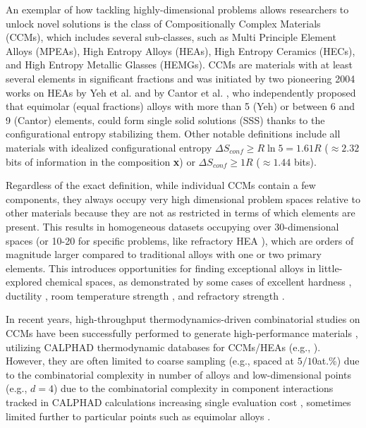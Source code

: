 An exemplar of how tackling highly-dimensional problems allows researchers to unlock novel solutions is the class of Compositionally Complex Materials (CCMs), which includes several sub-classes, such as Multi Principle Element Alloys (MPEAs), High Entropy Alloys (HEAs), High Entropy Ceramics (HECs), and High Entropy Metallic Glasses (HEMGs). CCMs are materials with at least several elements in significant fractions and was initiated by two pioneering 2004 works on HEAs by Yeh et al. \cite{Yeh2004NanostructuredOutcomes} and by Cantor et al. \cite{Cantor2004MicrostructuralAlloys}, who independently proposed that equimolar (equal fractions) alloys with more than 5 (Yeh) or between 6 and 9 (Cantor) elements, could form single solid solutions (SSS) thanks to the configurational entropy stabilizing them. Other notable definitions include all materials with idealized configurational entropy $\Delta S_{conf}  \geq R \ln{5} = 1.61R$ \cite{Li2019MechanicalAlloys} ($\approx2.32$ bits of information in the composition \textbf{x}) or $\Delta S_{conf}  \geq 1R$  \cite{Senkov2019HighAlloys} ($\approx1.44$ bits).

Regardless of the exact definition, while individual CCMs contain a few components, they always occupy very high dimensional problem spaces relative to other materials because they are not as restricted in terms of which elements are present. This results in homogeneous datasets occupying over 30-dimensional spaces (or 10-20 for specific problems, like refractory HEA \cite{Senkov2019HighAlloys}), which are orders of magnitude larger compared to traditional alloys with one or two primary elements. This introduces opportunities for finding exceptional alloys in little-explored chemical spaces, as demonstrated by some cases of excellent hardness \cite{Senkov2010RefractoryAlloys}, ductility \cite{Zhang2019PrecipitationAlloy}, room temperature strength \cite{Long2019AProperties}, and refractory strength \cite{Senkov2016DevelopmentSuperalloy, Kang2021SuperiorProcess}. 

In recent years, high-throughput thermodynamics-driven combinatorial studies on CCMs have been successfully performed to generate high-performance materials \cite{Elder2023ComputationalValidation, Elder2023ComputationalDown-selection}, utilizing  CALPHAD thermodynamic databases for CCMs/HEAs (e.g., \cite{Ostrowska2020ThermodynamicW, Ostrowska2022ThermodynamicExperiments, GambaroCombinedAlloys}). However, they are often limited to coarse sampling (e.g., spaced at $5/10$at.\%) due to the combinatorial complexity in number of alloys and low-dimensional points (e.g., $d=4$) due to the combinatorial complexity in component interactions tracked in CALPHAD calculations increasing single evaluation cost \cite{Elder2023ComputationalValidation, Elder2023ComputationalDown-selection}, sometimes limited further to particular points such as equimolar alloys \cite{Yan2021AcceleratedLearning}.


